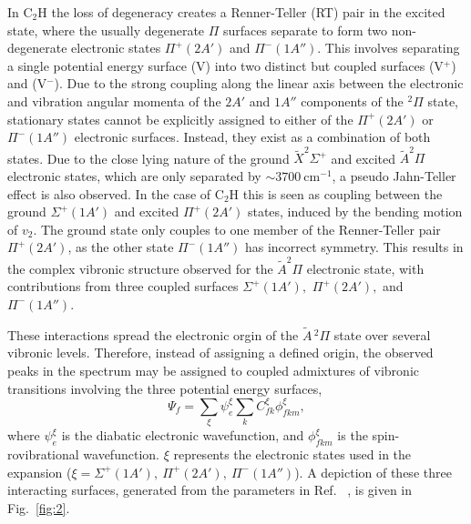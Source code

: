 \documentclass[journal=jpcafh,manuscript=article,layout=onecolumn, 12pt]{achemso}
\newcommand{\onlinecite}[1]{\hspace{-1 ex} \nocite{#1}\citenum{#1}}
\begin{document}
In C$_2$H the loss of degeneracy creates a Renner-Teller (RT) pair in the excited state, where the usually degenerate $\Pi$ surfaces separate to form two non-degenerate electronic states $\Pi^+ (2A')$ and $\Pi^-(1A'')$. This involves separating a single potential energy surface (V) into two distinct but coupled surfaces (V$^+$) and (V$^-$). Due to the strong coupling along the linear axis between the electronic and vibration angular momenta of the $2A'$ and $1A''$ components of the $^2\Pi$ state, stationary states cannot be explicitly assigned to either of the $\Pi^+(2A')$ or $\Pi^-(1A'')$ electronic surfaces. Instead, they exist as a combination of both states. Due to the close lying nature of the ground {$\tilde{X} ^2\Sigma^+$} and excited {$\tilde{A} ^2\Pi$} electronic states, which are only separated by $\sim3700~$cm$^{-1}$, a pseudo Jahn-Teller effect is also observed. %
In the case of C$_2$H this is seen as coupling between the ground $\Sigma^+(1A')$ and excited $\Pi^+(2A')$ states, induced by the bending motion of $v_2$. The ground state only couples to one member of the Renner-Teller pair $\Pi^+(2A')$, as the other state $\Pi^-(1A'')$ has incorrect symmetry. This results in the complex vibronic structure observed for the $\tilde{A}^2\Pi$ electronic state, with contributions from three coupled surfaces $\Sigma^+(1A'),$ $\Pi^+(2A'),$ and $\Pi^-(1A'')$.

These interactions spread the electronic orgin of the $\tilde{A}\,^2\Pi$ state over several vibronic levels. Therefore, instead of assigning a defined origin, the observed peaks in the spectrum may be assigned to coupled admixtures of vibronic transitions involving the three potential energy surfaces,
\begin{equation}
\Psi_f = \sum_\xi \psi_e^\xi \sum_k C_{fk}^\xi\phi_{fkm}^\xi,
\label{eq:teller3} 
\end{equation}
where $\psi_e^\xi$ is the diabatic electronic wavefunction, and $\phi_{fkm}^\xi$ is the spin-rovibrational wavefunction. $\xi$ represents the electronic states used in the expansion ($\xi=\Sigma^+(1A'),~\Pi^+(2A'),~\Pi^-(1A'')$). A depiction of these three interacting surfaces, generated from the parameters in Ref.~\onlinecite{tar03}, is given in Fig.~\ref{fig:2}.
\end{document}
